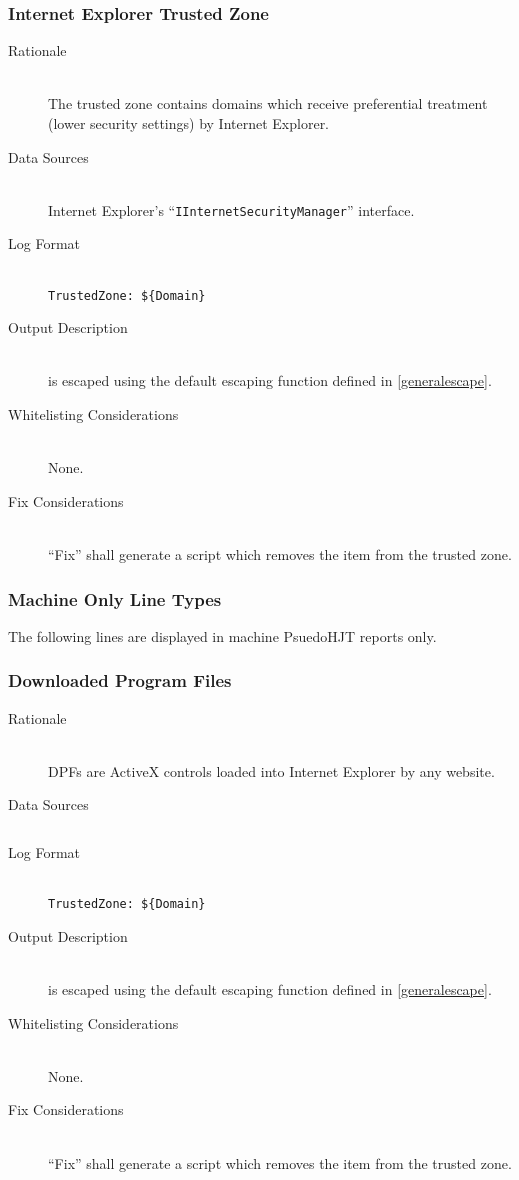 \subsubsection{Internet Explorer Trusted Zone}
\begin{description}
\item[Rationale] \hfill \\
The trusted zone contains domains which receive preferential treatment (lower
security settings) by Internet Explorer.
\item[Data Sources] \hfill \\
Internet Explorer's ``\verb|IInternetSecurityManager|'' interface.
\item[Log Format] \hfill \\
\verb|TrustedZone: ${Domain}|
\item[Output Description] \hfill \\
 is escaped using the default escaping function defined in
\ref{generalescape}.
\item[Whitelisting Considerations] \hfill \\
None.
\item[Fix Considerations] \hfill \\
``Fix'' shall generate a script which removes the item from the trusted zone.
\end{description}

\subsubsection{Machine Only Line Types}
The following lines are displayed in machine PsuedoHJT reports only.

\subsubsection{Downloaded Program Files}
\begin{description}
\item[Rationale] \hfill \\
DPFs are ActiveX controls loaded into Internet Explorer by any website.
\item[Data Sources] \hfill
\vspace{-\baselineskip}
\begin{verbatim}

\end{verbatim}
\item[Log Format] \hfill \\
\verb|TrustedZone: ${Domain}|
\item[Output Description] \hfill \\
 is escaped using the default escaping function defined in
\ref{generalescape}.
\item[Whitelisting Considerations] \hfill \\
None.
\item[Fix Considerations] \hfill \\
``Fix'' shall generate a script which removes the item from the trusted zone.
\end{description}

